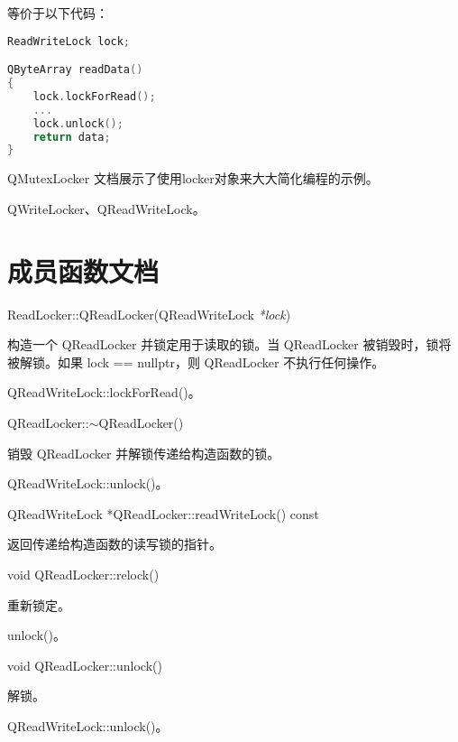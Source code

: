 等价于以下代码：

\begin{lstlisting}[language=C++]
ReadWriteLock lock;

QByteArray readData()
{
    lock.lockForRead();
    ...
    lock.unlock();
    return data;
}
\end{lstlisting}

QMutexLocker 文档展示了使用locker对象来大大简化编程的示例。

\begin{seeAlso}
QWriteLocker、QReadWriteLock。
\end{seeAlso}

\section{成员函数文档}

ReadLocker::QReadLocker(QReadWriteLock \emph{*lock})

构造一个 QReadLocker 并锁定用于读取的锁。当 QReadLocker 被销毁时，锁将被解锁。如果 lock == nullptr，则 QReadLocker 不执行任何操作。


\begin{seeAlso}
QReadWriteLock::lockForRead()。
\end{seeAlso}

QReadLocker::$\sim$QReadLocker()

销毁 QReadLocker 并解锁传递给构造函数的锁。

\begin{seeAlso}
QReadWriteLock::unlock()。
\end{seeAlso}

QReadWriteLock *QReadLocker::readWriteLock() const

返回传递给构造函数的读写锁的指针。

void QReadLocker::relock()

重新锁定。

\begin{seeAlso}
unlock()。
\end{seeAlso}

void QReadLocker::unlock()

解锁。

\begin{seeAlso}
QReadWriteLock::unlock()。
\end{seeAlso}